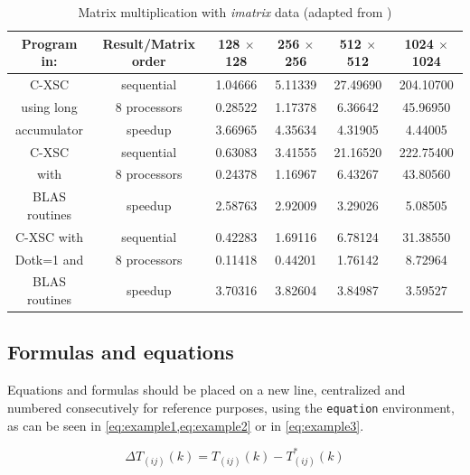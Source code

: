 \documentclass[alpha-refs,english]{RBCA_v3.0}
\begin{document}
\begin{table}[ht]
	\caption{Matrix multiplication with \emph{imatrix} data (adapted from \citep{Holbig2003})}\label{tab:example:wide}
	\begin{tabularx}{\linewidth}{c c C C C C}
		\toprule
	    \textbf{Program in:} & Result/Matrix order  & \textbf{128 $\times$ 128} & \textbf{256 $\times$ 256} & \textbf{512 $\times$ 512} & \textbf{1024 $\times$ 1024}\\
		\midrule
        C-XSC     & sequential  & 1.04666 & 5.11339 & 27.49690 & 204.10700 \\
        using long          & 8 processors & 0.28522 & 1.17378 & 6.36642 & 45.96950 \\
        accumulator          & speedup & 3.66965 & 4.35634 & 4.31905 & 4.44005 \\
        \hline
        C-XSC & sequential & 0.63083 & 3.41555 & 21.16520 & 222.75400 \\
        with     & 8 processors & 0.24378 & 1.16967 & 6.43267 & 43.80560 \\
        BLAS routines          & speedup & 2.58763 & 2.92009 & 3.29026 & 5.08505 \\
        \hline
        C-XSC with & sequential & 0.42283 & 1.69116 & 6.78124 & 31.38550 \\
        Dotk=1 and          & 8 processors & 0.11418 & 0.44201 & 1.76142 & 8.72964 \\
        BLAS routines          & speedup & 3.70316 & 3.82604 & 3.84987 & 3.59527 \\
		\bottomrule
	\end{tabularx}
\end{table}

\subsection{Formulas and equations}
Equations and formulas should be placed on a new line, centralized and numbered consecutively for reference purposes, using the \verb|equation| environment, as can be seen in \cref{eq:example1,eq:example2} or in \cref{eq:example3}.  

\begin{equation}
	\Delta T_{(ij)} (\textit{k})= T_{(ij)} (\textit{k}) - T^*_{(ij)} (\textit{k})
\label{eq:example1}
\end{equation}
\end{document}
